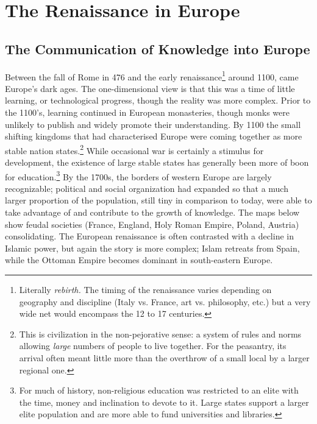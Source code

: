 \graphicspath{{7ren/pics/}}

\section{The Renaissance in Europe}

\subsection{The Communication of Knowledge into Europe}

Between the fall of Rome in 476 and the early renaissance\footnote{Literally \emph{rebirth.} The timing of the renaissance varies depending on geography and discipline (Italy vs.{} France, art vs.{} philosophy, etc.) but a very wide net would encompass the 12\th{} to 17\th{} centuries.} around 1100, came Europe's dark ages. The one-dimensional view is that this was a time of little learning, or technological progress, though the reality was more complex. Prior to the 1100's, learning continued in European monasteries, though monks were unlikely to publish and widely promote their understanding. By 1100 the small shifting kingdoms that had characterised Europe were coming together as more stable nation states.\footnote{This is civilization in the non-pejorative sense: a system of rules and norms allowing \emph{large} numbers of people to live together. For the peasantry, its arrival often meant little more than the overthrow of a small local by a larger regional one.} While occasional war is certainly a stimulus for development, the existence of large stable states has generally been more of boon for education.\footnote{For much of history, non-religious education was restricted to an elite with the time, money and inclination to devote to it. Large states support a larger elite population and are more able to fund universities and libraries.} By the 1700s, the borders of western Europe are largely recognizable; political and social organization had expanded so that a much larger proportion of the population, still tiny in comparison to today, were able to take advantage of and contribute to the growth of knowledge. The maps below show feudal societies (France, England, Holy Roman Empire, Poland, Austria) consolidating. The European renaissance is often contrasted with a decline in Islamic power, but again the story is more complex; Islam retreats from Spain, while the Ottoman Empire becomes dominant in south-eastern Europe.

